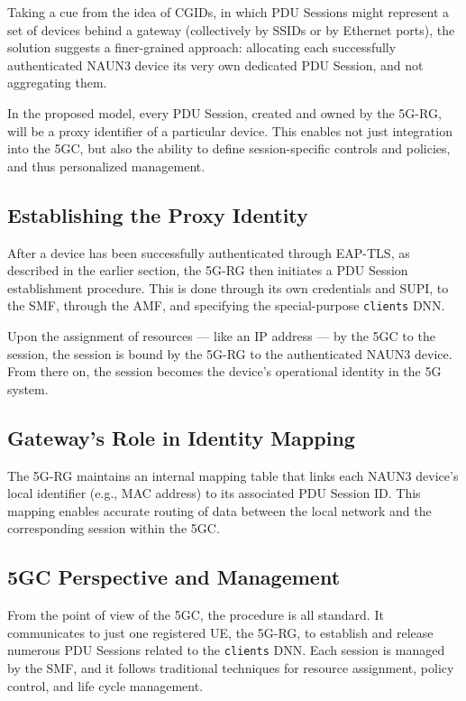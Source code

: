 Taking a cue from the idea of \acp{CGID}, in which \ac{PDU} Sessions might represent a set of devices behind a gateway (collectively by \acp{SSID} or by Ethernet ports), the solution suggests a finer-grained approach: allocating each successfully authenticated \ac{NAUN3} device its very own dedicated \ac{PDU} Session, and not aggregating them.

In the proposed model, every \ac{PDU} Session, created and owned by the \ac{5G-RG}, will be a proxy identifier of a particular device. This enables not just integration into the \ac{5GC}, but also the ability to define session-specific controls and policies, and thus personalized management.

\subsection{Establishing the Proxy Identity}

After a device has been successfully authenticated through \ac{EAP-TLS}, as described in the earlier section, the \ac{5G-RG} then initiates a \ac{PDU} Session establishment procedure. This is done through its own credentials and \ac{SUPI}, to the \ac{SMF}, through the \ac{AMF}, and specifying the special-purpose \texttt{clients} \ac{DNN}.

Upon the assignment of resources — like an \ac{IP} address — by the \ac{5GC} to the session, the session is bound by the \ac{5G-RG} to the authenticated \ac{NAUN3} device. From there on, the session becomes the device’s operational identity in the \ac{5G} system.

\subsection{Gateway’s Role in Identity Mapping}

The \ac{5G-RG} maintains an internal mapping table that links each \ac{NAUN3} device’s local identifier (e.g., \ac{MAC} address) to its associated \ac{PDU} Session ID. This mapping enables accurate routing of data between the local network and the corresponding session within the \ac{5GC}.

\subsection{\ac{5GC} Perspective and Management}

From the point of view of the \ac{5GC}, the procedure is all standard. It communicates to just one registered \ac{UE}, the \ac{5G-RG}, to establish and release numerous \ac{PDU} Sessions related to the \texttt{clients} \ac{DNN}. Each session is managed by the \ac{SMF}, and it follows traditional techniques for resource assignment, policy control, and life cycle management.

